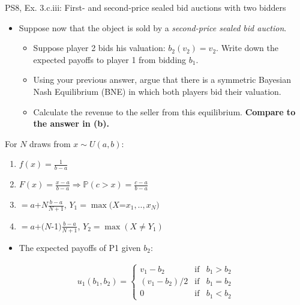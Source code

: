 \begin{frame}{PS8, Ex. 3.c.iii: First- and second-price sealed bid auctions with two bidders}
    \begin{multicols}{2}
      \begin{itemize}
        \item[(c)] Suppose now that the object is sold by a \textit{second-price sealed bid auction}.
        \begin{itemize}\normalsize
          \item[i.]   Suppose player 2 bids his valuation: $b_2(v_2) = v_2$. Write down the expected payoffs to player 1 from bidding $b_1$.
          \item[ii.]  Using your previous answer, argue that there is a symmetric Bayesian Nash Equilibrium (BNE) in which both players bid their valuation.
          \item[iii.] Calculate the revenue to the seller from this equilibrium. \textbf{Compare to the answer in (b).}
        \end{itemize}
      \end{itemize}
      For $N$ draws from $x\sim U(a, b):$
      \vspace{-6pt}
      \begin{enumerate}
        \item[PDF:] $f(x)=\frac{1}{b-a}$
        \item[CDF:] $F(x)=\frac{x-a}{b-a}\Rightarrow\mathbb{P}(c>x)=\frac{c-a}{b-a}$
        \item[$\mathbb{E}(Y_1)$] $=a$+$N\frac{b-a}{N+1}$, $Y_1=\max(X$=$x_1,..,x_N)$
        \item[$\mathbb{E}(Y_2)$] $=a$+$(N$-1$)\frac{b-a}{N+1}$, $Y_2=\max(X\neq Y_1)$
      \end{enumerate}
      \vfill\null\columnbreak
      \begin{itemize}
        \item[(i)] The expected payoffs of P1 given $b_2$:
      \end{itemize}
      \vspace{-16pt}
      \begin{align*}
        u_1(b_1,b_2)=\left\{\begin{array}{lcl}
          v_1-b_2     & \text{if} & b_1>b_2 \\
          (v_1-b_2)/2 & \text{if} & b_1=b_2 \\
          0           & \text{if} & b_1<b_2
        \end{array}\right.
      \end{align*}

\end{multicols}
\end{frame}
